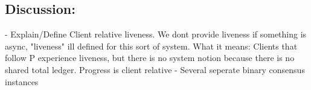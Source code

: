 \subsection{Discussion: }
- Explain/Define Client relative liveness. We dont provide liveness if something is async, "liveness" ill defined for this sort of system. What it means: Clients that follow P experience liveness, but there is no system notion because there is no shared total ledger.  Progress is client relative
- Several seperate binary consensus instances 